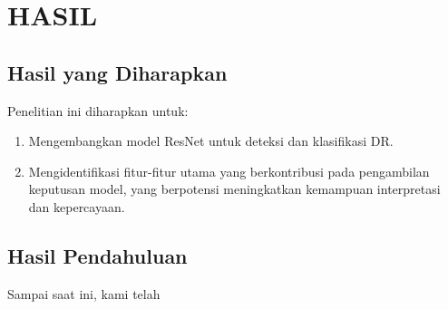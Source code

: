 \chapter{HASIL}

\section{Hasil yang Diharapkan}

Penelitian ini diharapkan untuk:
\begin{enumerate}
    \item Mengembangkan model ResNet untuk deteksi dan klasifikasi DR.
    \item Mengidentifikasi fitur-fitur utama yang berkontribusi pada pengambilan keputusan model, yang berpotensi meningkatkan kemampuan interpretasi dan kepercayaan.
\end{enumerate}

\section{Hasil Pendahuluan}

Sampai saat ini, kami telah \lipsum[16]
